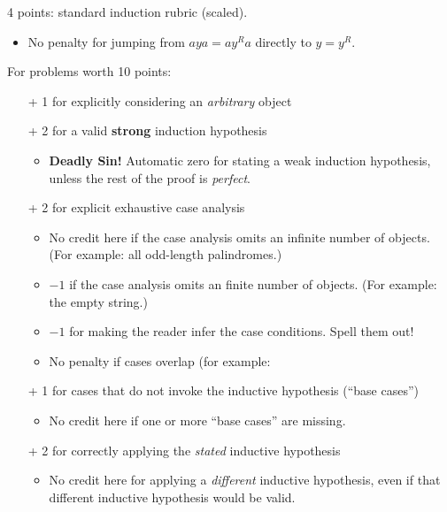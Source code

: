 \documentclass[11pt]{article}
\begin{document}
\begin{enumerate}
\begin{solution}
\begin{rubric}
4 points: standard induction rubric (scaled).
\begin{itemize}
\item No penalty for jumping from $aya = ay^Ra$ directly to $y = y^R$.
\end{itemize}
\end{rubric}

\end{solution}



\begin{rubric}[induction]
For problems worth 10 points:
\begin{itemize}\itemsep0pt
\item[+] 1 for explicitly considering an \emph{arbitrary} object

\item[+] 2 for a valid \textbf{strong} induction hypothesis
\begin{itemize}\itemsep0pt
\item \textbf{\color{Red}Deadly Sin!} Automatic zero for stating a weak induction hypothesis, unless the rest of the proof is \emph{perfect}.
\end{itemize}

\item[+] 2 for explicit exhaustive case analysis
\begin{itemize}\itemsep0pt
\item No credit here if the case analysis omits an infinite number of objects.  (For example: all odd-length palindromes.)
\item $-1$ if the case analysis omits an finite number of objects.  (For example: the empty string.)
\item $-1$ for making the reader infer the case conditions.  Spell them out!
\item No penalty if cases overlap (for example:
\end{itemize}

\item[+] 1 for cases that do not invoke the inductive hypothesis (“base cases”)
\begin{itemize}\itemsep0pt
\item No credit here if one or more “base cases” are missing.
\end{itemize}

\item[+] 2 for correctly applying the \emph{stated} inductive hypothesis
\begin{itemize}\itemsep0pt
\item No credit here for applying a \emph{different} inductive hypothesis, even if that different inductive hypothesis would be valid.
\end{itemize}


\end{itemize}
\end{rubric}
\end{enumerate}
\end{document}
